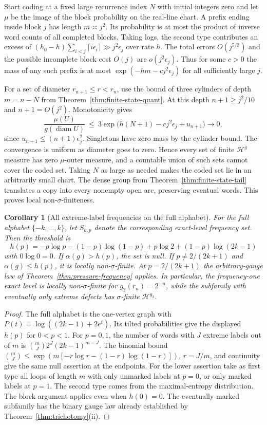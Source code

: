 \documentclass[11pt]{article}
\newtheorem{corollary}[theorem]{Corollary}
\theoremstyle{definition}
\theoremstyle{remark}
\begin{document}
Start coding at a fixed large recurrence index $N$ with initial
integers zero and let $\mu$ be the image of the block probability
on the real-line chart. A prefix ending inside block $j$ has
length $m\asymp j^2$. Its probability is at most the product
of inverse word counts of all completed blocks. Taking logs,
the second type contributes an excess of
$(h_0-h)\sum_{i<j}\lceil i\epsilon_i\rceil\gg j^2\epsilon_j$
over rate $h$. The total errors $O(j^{5/3})$ and the possible
incomplete block cost $O(j)$ are $o(j^2\epsilon_j)$.
Thus for some $c>0$ the mass of any such prefix is at most
$\exp(-hm-cj^2\epsilon_j)$ for all sufficiently large $j$.

For a set of diameter $r_{n+1}\le r<r_n$, use the bound of
three cylinders of depth $m=n-N$ from
Theorem~\ref{thm:finite-state-quant}. At this depth $n+1\ge j^2/10$
and $n+1=O(j^2)$. Monotonicity gives
\[
 \frac{\mu(U)}{g(\operatorname{diam}U)}
 \ \le\ 3\exp\bigl(h(N+1)-cj^2\epsilon_j+u_{n+1}\bigr)
 \longrightarrow 0 ,
\]
since $u_{n+1}\le(n+1)\epsilon_j^2$. Singletons have zero mass
by the cylinder bound. The convergence is uniform as diameter
goes to zero. Hence every set of finite $\mathcal H^g$ measure
has zero $\mu$-outer measure, and a countable union of such
sets cannot cover the coded set. Taking $N$ as large as needed
makes the coded set lie in an arbitrarily small chart.
The dense group from Theorem~\ref{thm:finite-state-tail}
translates a copy into every nonempty open arc, preserving
eventual words. This proves local non-$\sigma$-finiteness.

\begin{corollary}[All extreme-label frequencies on the full alphabet]
\label{cor:full-alphabet-frequency}
For the full alphabet $\{-k,\ldots,k\}$, let $S_{k,p}$ denote
the corresponding exact-level frequency set. Then the threshold is
\[
 h(p)=-p\log p-(1-p)\log(1-p)
      +p\log 2+(1-p)\log(2k-1)
\]
with $0\log0=0$. If $\alpha(g)>h(p)$, the set is null.
If $p\ne 2/(2k+1)$ and $\alpha(g)\le h(p)$, it is locally
non-$\sigma$-finite. At $p=2/(2k+1)$ the arbitrary-gauge
law of Theorem~\ref{thm:pressure-frequency} applies. In particular,
the frequency-one exact level is locally non-$\sigma$-finite
for $g_2(r_n)=2^{-n}$, while the subfamily with eventually
only extreme defects has $\sigma$-finite $\mathcal H^{g_2}$.
\end{corollary}

\begin{proof}
The full alphabet is the one-vertex graph with
$P(t)=\log((2k-1)+2e^t)$. Its tilted probabilities give
the displayed $h(p)$ for $0<p<1$. For $p=0,1$, the number
of words with $J$ extreme labels out of $m$ is
$\binom mJ 2^J(2k-1)^{m-J}$. The binomial bound
$\binom mJ\le \exp(m[-r\log r-(1-r)\log(1-r)])$, $r=J/m$,
and continuity give the same null assertion at the endpoints.
For the lower assertion take as first type all loops of length $m$
with only unmarked labels at $p=0$, or only marked labels at $p=1$.
The second type comes from the maximal-entropy distribution.
The block argument applies even when $h(0)=0$.
The eventually-marked subfamily has the binary gauge law already
established by Theorem~\ref{thm:trichotomy}(ii).
\end{proof}
\end{document}
